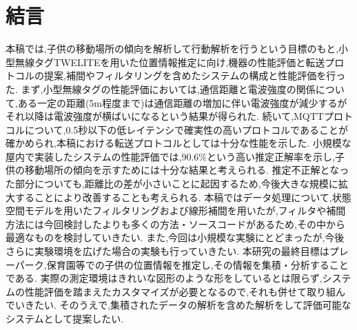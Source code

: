 \chapter{結言}
本稿では,子供の移動場所の傾向を解析して行動解析を行うという目標のもと,小型無線タグTWELITEを用いた位置情報推定に向け,機器の性能評価と転送プロトコルの提案,補間やフィルタリングを含めたシステムの構成と性能評価を行った.
まず,小型無線タグの性能評価においては,通信距離と電波強度の関係について,ある一定の距離(5m程度まで)は通信距離の増加に伴い電波強度が減少するがそれ以降は電波強度が横ばいになるという結果が得られた.
続いて,MQTTプロトコルについて,0.5秒以下の低レイテンシで確実性の高いプロトコルであることが確かめられ,本稿における転送プロトコルとしては十分な性能を示した.
小規模な屋内で実装したシステムの性能評価では,90.6\%という高い推定正解率を示し,子供の移動場所の傾向を示すためには十分な結果と考えられる.
推定不正解となった部分についても,距離比の差が小さいことに起因するため,今後大きな規模に拡大することにより改善することも考えられる.
本稿ではデータ処理について,状態空間モデルを用いたフィルタリングおよび線形補間を用いたが,フィルタや補間方法には今回検討したよりも多くの方法・ソースコードがあるため,その中から最適なものを検討していきたい.
また,今回は小規模な実験にとどまったが,今後さらに実験環境を広げた場合の実験も行っていきたい.
本研究の最終目標はプレーパーク,保育園等での子供の位置情報を推定し,その情報を集積・分析することである.
実際の測定環境はきれいな図形のような形をしているとは限らず,システムの性能評価を踏まえたカスタマイズが必要となるので,それも併せて取り組んでいきたい.
そのうえで,集積されたデータの解析を含めた解析をして評価可能なシステムとして提案したい.

